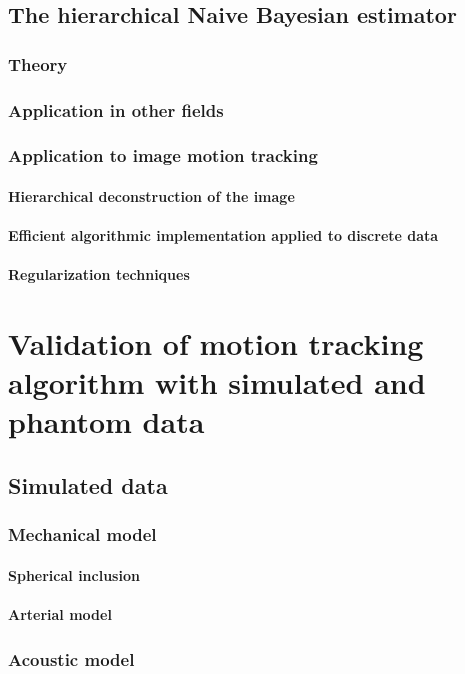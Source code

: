 \documentclass[12pt,twoside]{withesis}
\begin{document}
\section{The hierarchical Naive Bayesian estimator}
\subsection{Theory}
\subsection{Application in other fields}
\subsection{Application to image motion tracking}
\subsubsection{Hierarchical deconstruction of the image}
\subsubsection{Efficient algorithmic implementation applied to discrete data}
\subsubsection{Regularization techniques}


\chapter{Validation of motion tracking algorithm with simulated and phantom
data}

\section{Simulated data}
\subsection{Mechanical model}
\subsubsection{Spherical inclusion}
\subsubsection{Arterial model}
\subsection{Acoustic model}
\end{document}
